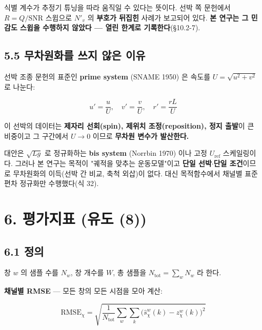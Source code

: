\documentclass[10pt,a4paper]{article}
\begin{document}
식별 계수가 추정기 튜닝을 따라 움직일 수 있다는 뜻이다. 선박 쪽 문헌에서 $R = Q/\text{SNR}$ 스윕으로 $N'_v$ 의 \textbf{부호가 뒤집힌} 사례가 보고되어 있다. \textbf{본 연구는 그 민감도 스윕을 수행하지 않았다 --- 열린 한계로 기록한다}(\S{}10.2-7).

\subsection*{5.5 무차원화를 쓰지 않은 이유}

선박 조종 문헌의 표준인 \textbf{prime system} (SNAME 1950) 은 속도를 $U = \sqrt{u^2 + v^2}$ 로 나눈다:

\begin{equation*}
u' = \frac{u}{U},\quad v' = \frac{v}{U},\quad r' = \frac{rL}{U} \tag{36}
\end{equation*}

이 선박의 데이터는 \textbf{제자리 선회(spin), 제위치 조정(reposition), 정지 출발}이 큰 비중이고 그 구간에서 $U \to 0$ 이므로 \textbf{무차원 변수가 발산한다.}

대안은 $\sqrt{Lg}$ 로 정규화하는 \textbf{bis system} (Norrbin 1970) 이나 고정 $U_{\text{ref}}$ 스케일링이다. 그러나 본 연구는 목적이 "궤적을 맞추는 운동모델"이고 \textbf{단일 선박$\cdot$단일 조건}이므로 무차원화의 이득(선박 간 비교, 축척 외삽)이 없다. 대신 목적함수에서 채널별 표준편차 정규화만 수행했다(식 32).

\section*{6. 평가지표 (유도 (8))}

\subsection*{6.1 정의}

창 $w$ 의 샘플 수를 $N_w$, 창 개수를 $W$, 총 샘플을 $N_{\text{tot}} = \sum_w N_w$ 라 한다.

\textbf{채널별 RMSE} --- 모든 창의 모든 시점을 모아 계산:

\begin{equation*}
\mathrm{RMSE}_\chi = \sqrt{\frac{1}{N_{\text{tot}}}
\sum_{w}\sum_{k} \big(\hat{s}^w_\chi(k) - z^w_\chi(k)\big)^2} \tag{37}
\end{equation*}
\end{document}
